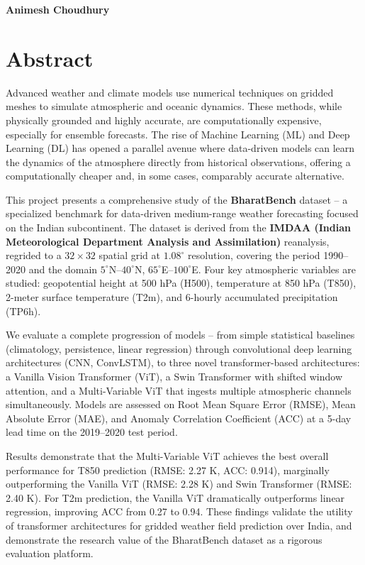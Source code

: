 \documentclass[12pt,a4paper,oneside]{report}
\begin{document}
\vspace{2cm}
\begin{flushright}
\textbf{Animesh Choudhury}
\end{flushright}
\newpage

\thispagestyle{empty}
\chapter*{Abstract}
Advanced weather and climate models use numerical techniques on gridded meshes to simulate atmospheric and oceanic dynamics. These methods, while physically grounded and highly accurate, are computationally expensive, especially for ensemble forecasts. The rise of Machine Learning (ML) and Deep Learning (DL) has opened a parallel avenue where data-driven models can learn the dynamics of the atmosphere directly from historical observations, offering a computationally cheaper and, in some cases, comparably accurate alternative.

This project presents a comprehensive study of the \textbf{BharatBench} dataset -- a specialized benchmark for data-driven medium-range weather forecasting focused on the Indian subcontinent. The dataset is derived from the \textbf{IMDAA (Indian Meteorological Department Analysis and Assimilation)} reanalysis, regrided to a $32 \times 32$ spatial grid at $1.08^\circ$ resolution, covering the period 1990--2020 and the domain $5^\circ$N--$40^\circ$N, $65^\circ$E--$100^\circ$E. Four key atmospheric variables are studied: geopotential height at 500 hPa (H500), temperature at 850 hPa (T850), 2-meter surface temperature (T2m), and 6-hourly accumulated precipitation (TP6h).

We evaluate a complete progression of models -- from simple statistical baselines (climatology, persistence, linear regression) through convolutional deep learning architectures (CNN, ConvLSTM), to three novel transformer-based architectures: a Vanilla Vision Transformer (ViT), a Swin Transformer with shifted window attention, and a Multi-Variable ViT that ingests multiple atmospheric channels simultaneously. Models are assessed on Root Mean Square Error (RMSE), Mean Absolute Error (MAE), and Anomaly Correlation Coefficient (ACC) at a 5-day lead time on the 2019--2020 test period.

Results demonstrate that the Multi-Variable ViT achieves the best overall performance for T850 prediction (RMSE: 2.27 K, ACC: 0.914), marginally outperforming the Vanilla ViT (RMSE: 2.28 K) and Swin Transformer (RMSE: 2.40 K). For T2m prediction, the Vanilla ViT dramatically outperforms linear regression, improving ACC from 0.27 to 0.94. These findings validate the utility of transformer architectures for gridded weather field prediction over India, and demonstrate the research value of the BharatBench dataset as a rigorous evaluation platform.
\end{document}
